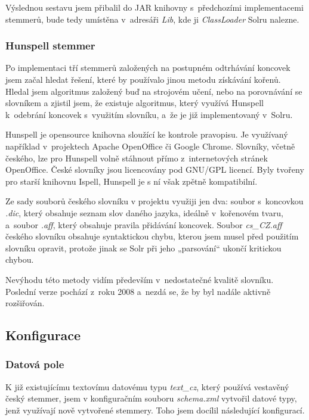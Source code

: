 Výslednou sestavu jsem přibalil do JAR knihovny s~předchozími implementacemi stemmerů, bude tedy umístěna v~adresáři \emph{Lib}, kde ji \emph{ClassLoader} Solru nalezne.

\subsubsection{Hunspell stemmer}
Po implementaci tří stemmerů založených na postupném odtrhávání koncovek jsem začal hledat řešení, které by používalo jinou metodu získávání kořenů. Hledal jsem algoritmus založený buď na strojovém učení, nebo na porovnávání se slovníkem a zjistil jsem, že existuje algoritmus, který využívá Hunspell k~odebrání koncovek s~využitím slovníku, a~že je již implementovaný v~Solru.

Hunspell je opensource knihovna sloužící ke kontrole pravopisu. Je využívaný například v~projektech Apache OpenOffice či Google Chrome. Slovníky, včetně českého, lze pro Hunspell volně stáhnout přímo z~internetových stránek OpenOffice\cite{openoffice}. České slovníky jsou licencovány pod GNU/GPL licencí. Byly tvořeny pro starší knihovnu Ispell, Hunspell je s ní však zpětně kompatibilní.

Ze sady souborů českého slovníku v projektu využiji jen dva: soubor s~koncovkou \emph{.dic}, který obsahuje seznam slov daného jazyka, ideálně v~kořenovém tvaru, a~soubor \emph{.aff}, který obsahuje pravila přidávání koncovek\cite{zdrojak}. Soubor \emph{cs\_CZ.aff} českého slovníku obsahuje syntaktickou chybu, kterou jsem musel před použitím slovníku opravit, protože jinak se Solr při jeho „parsování“ ukončí kritickou chybou.

Nevýhodu této metody vidím především v~nedostatečné kvalitě slovníku. Poslední verze pochází z~roku 2008 a~nezdá se, že by byl nadále aktivně rozšiřován.

\subsection{Konfigurace} \label{sorlconfig}
\subsubsection{Datová pole}
K již existujícímu textovímu datovému typu \emph{text\_cz}, který používá vestavěný český stemmer, jsem v konfiguračním souboru \emph{schema.xml} vytvořil datové typy, jenž využívají nově vytvořené stemmery. Toho jsem docílil následující konfigurací.

